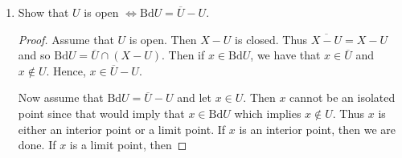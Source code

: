 \documentclass[12pt]{article}
\theoremstyle{definition}
\begin{document}
\begin{enumerate}
\begin{enumerate}[label=(\alph*)]
                    \begin{proof}
                        Assume that $\text{Bd}A=\varnothing$, then every point 
                        of $A$ is an interior point. Meaning, for every $x\in A$, 
                        there exists an open set $U\subset A$ such that $x\in U$. 
                        Thus $A$ is open. On the other hand, if $x$ is a limit point of 
                        $A$, then $x\in\overline{A}$, and for any neighborhood, 
                        $U$, of $x$ we have that if there exists $y\in U$ such 
                        that $y\notin A$, then that implies $x$ is a limit point of 
                        $X-A$, which would imply that $x\in\overline{X-A}$ and hence 
                        $x\in\overline{A}\cap(\overline{X-A})$, a contradiction. 
                        Therefore, $A$ contains all of its limit points and $A$ is 
                        thereby closed.\par\hspace{4mm} Assume that $A$ is 
                        both open and closed. Since $A$ is open, then for every point, 
                        $x$, in $A$, there exists a neighborhood, $U$, of 
                        $x$ such that $U\subset A$. Hence $A=\text{Int}A$, 
                        and since, by (a), the interior and boundary are disjoint, 
                        then it follows that $\text{Bd}A=\varnothing$.  
                    \end{proof}
                \item Show that $U$ is open $\Leftrightarrow\text{Bd}U=\overline{U}-U$.
                    \begin{proof}
                        Assume that $U$ is open. Then $X-U$ is closed. Thus $\overline{X-U}=X-U$ 
                        and so $\text{Bd}U=\overline{U}\cap(X-U)$. Then if 
                        $x\in\text{Bd}U$, we have that $x\in\overline{U}$ 
                        and $x\notin U$. Hence, $x\in\overline{U}-U$.\par\hspace{4mm} 
                        Now assume that $\text{Bd}U=\overline{U}-U$ and let 
                        $x\in U$. Then $x$ cannot be an isolated point since 
                        that would imply that $x\in\text{Bd}U$ which implies 
                        $x\notin U$. Thus $x$ is either an interior point 
                        or a limit point. If $x$ is an interior point, 
                        then we are done. If $x$ is a limit point, then 

\end{proof}
\end{enumerate}
\end{enumerate}
\end{document}

